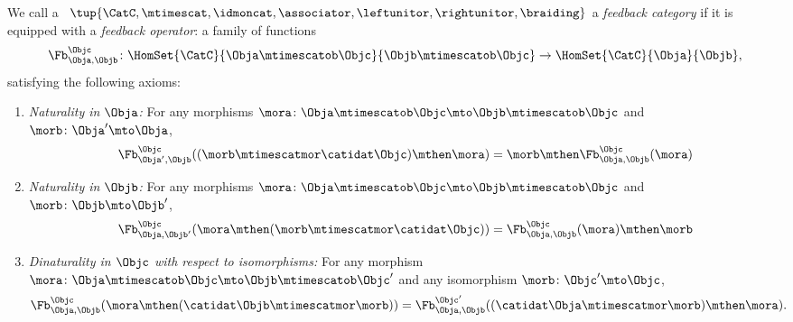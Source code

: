 \begin{ctdefinition}
    \label{def:feedback-cat}
    We call a ~$\tup{\CatC, \mtimescat, \idmoncat, \associator, \leftunitor, \rightunitor, \braiding}$ a \emph{feedback category} if it is equipped with a \emph{feedback operator}: a family of functions
    \begin{equation}
        \Fb_{\Obja,\Objb}^\Objc\colon \HomSet{\CatC}{\Obja \mtimescatob \Objc}{\Objb\mtimescatob \Objc}\to \HomSet{\CatC}{\Obja}{\Objb},
    \end{equation}
    satisfying the following axioms:
    \begin{enumerate}
        \item \emph{Naturality in $\Obja$:} For any morphisms $\mora\colon \Obja\mtimescatob \Objc \mto \Objb\mtimescatob \Objc$ and $\morb \colon \Obja' \mto \Obja$,
              \begin{equation}\label{eq:feedback-naturality-1}
                  \Fb_{\Obja', \Objb}^\Objc ( (\morb \mtimescatmor \catidat\Objc) \mthen \mora) = \morb \mthen \Fb_{\Obja, \Objb}^\Objc (\mora)
              \end{equation}
        \item \emph{Naturality in $\Objb$:} For any morphisms $\mora\colon \Obja\mtimescatob \Objc \mto \Objb\mtimescatob \Objc$ and $\morb \colon \Objb \mto \Objb'$,
              \begin{equation}\label{eq:feedback-naturality-2}
                  \Fb_{\Obja, \Objb'}^\Objc ( \mora \mthen (\morb \mtimescatmor \catidat\Objc) ) = \Fb_{\Obja, \Objb}^\Objc (\mora) \mthen \morb
              \end{equation}
        \item \emph{Dinaturality in $\Objc$ with respect to isomorphisms:}
              For any morphism $\mora \colon \Obja  \mtimescatob \Objc \mto \Objb \mtimescatob \Objc'$ and any isomorphism $\morb \colon \Objc' \mto \Objc$,
              \begin{equation}\label{eq:feedback-dinaturality}
                  \Fb_{\Obja, \Objb}^{\Objc} (\mora \mthen (\catidat\Objb \mtimescatmor \morb)) = \Fb_{\Obja, \Objb}^{\Objc'}((\catidat\Obja \mtimescatmor \morb) \mthen \mora).
              \end{equation}


\end{enumerate}
\end{ctdefinition}
